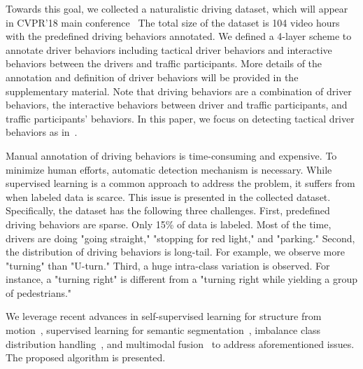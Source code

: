 \documentclass[10pt,twocolumn,letterpaper]{article}
\begin{document}
Towards this goal, we collected a naturalistic driving dataset, which will appear in CVPR'18 main conference~\cite{RamanishkaCVPR2018}%
The total size of the dataset is 104 video hours with the predefined driving behaviors annotated. %
We defined a 4-layer scheme to annotate driver behaviors including tactical driver behaviors and interactive behaviors between the drivers and traffic participants. More details of the annotation and definition of driver behaviors will be provided in the supplementary material. Note that driving behaviors are a combination of driver behaviors, the interactive behaviors between driver and traffic participants, and traffic participants' behaviors. In this paper, we focus on detecting tactical driver behaviors as in~\cite{RamanishkaCVPR2018}. 

Manual annotation of driving behaviors is time-consuming and expensive. To minimize human efforts, automatic detection mechanism is necessary. While supervised learning is a common approach to address the problem, it suffers from when labeled data is scarce. This issue is presented in the collected dataset. Specifically, the dataset has the following three challenges. First, predefined driving behaviors are sparse. Only 15\% of data is labeled. Most of the time, drivers are doing "going straight," "stopping for red light," and "parking." Second, the distribution of driving behaviors is long-tail. For example, we observe more "turning" than "U-turn." Third, a huge intra-class variation is observed. For instance, a "turning right" is different from a "turning right while yielding a group of pedestrians."

We leverage recent advances in self-supervised learning for structure from motion~\cite{ZhouCVPR2017}, supervised learning for semantic segmentation~\cite{LinCVPR2017,ChenPAMI2018}, imbalance class distribution handling~\cite{Lin2017b}, and multimodal fusion~\cite{hazirbas2016fusenet} to address aforementioned issues. The proposed algorithm is presented.    
\end{document}
